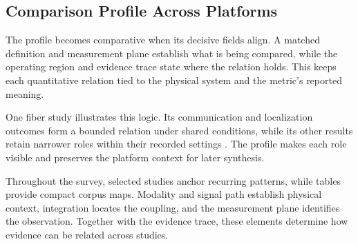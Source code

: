 \subsection{Comparison Profile Across Platforms}

The profile becomes comparative when its decisive fields align. A matched
definition and measurement plane establish what is being compared, while the
operating region and evidence trace state where the relation holds. This keeps
each quantitative relation tied to the physical system and the metric's
reported meaning.

One fiber study illustrates this logic. Its communication and localization
outcomes form a bounded relation under shared conditions, while its other
results retain narrower roles within their recorded settings
\cite{OISAC_SCR00056}. The profile makes each role visible and preserves the
platform context for later synthesis.

Throughout the survey, selected studies anchor recurring patterns, while tables
provide compact corpus maps.
Modality and signal path establish physical context, integration locates the
coupling, and the measurement plane identifies the observation. Together with
the evidence trace, these elements determine how evidence can be related
across studies.
